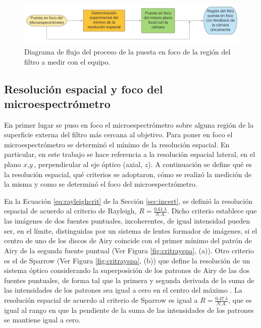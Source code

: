 \begin{figure}[H]
	\centering
	\includegraphics[width=1.0\textwidth]{Figs/microespectrometro/diagramfoco.png}
	\caption{Diagrama de flujo del proceso de la puesta en foco de la región del filtro a medir con el equipo.}
	\label{fig:diagpuestfoc}
\end{figure}




\singlespacing
\subsection{Resolución espacial y foco del microespectrómetro}
\label{sec:focoresol}

\hspace{0.5cm}En primer lugar se puso en foco el microespectrómetro sobre alguna región de la superficie externa del filtro más cercana al objetivo. Para poner en foco el microespectrómetro se determinó el mínimo de la resolución espacial. En particular, en este trabajo se hace referencia a la resolución espacial lateral, en el plano $\textit{x},\textit{y}$, perpendicular al eje óptico (axial, $\textit{z}$). A continuación se define qué es la resolución espacial, qué criterios se adoptaron, cómo se realizó la medición de la misma y como se determinó el foco del microespectrómetro.

En la Ecuación \ref{eq:rayleighcrit} de la Sección \ref{sec:incert}, se definió la resolución espacial de acuerdo al criterio de Rayleigh, $R = \frac{0.61 \hspace{2pt} \lambda}{ N.A.}$. Dicho criterio establece que las imágenes de dos fuentes puntuales, incoherentes, de igual intensidad pueden ser, en el límite, distinguidas por un sistema de lentes formador de imágenes, si el centro de uno de los discos de Airy coincide con el primer mínimo del patrón de Airy de la segunda fuente puntual (Ver Figura \ref{fig:critrayspa}, (a)). Otro criterio es el de Sparrow \cite{sparrow} (Ver Figura \ref{fig:critrayspa}, (b)) que define la resolución de un sistema óptico considerando la superposición de los patrones de Airy de las dos fuentes puntuales, de forma tal que la primera y segunda derivada de la suma de las intensidades de los patrones sea igual a cero en el centro del máximo \cite{raylsp}. La resolución espacial de acuerdo al criterio de Sparrow es igual a  $R = \frac{0.47 \hspace{2pt} \lambda}{ N.A.}$, que es igual al rango en que la pendiente de la suma de las intensidades de los patrones se mantiene igual a cero.

